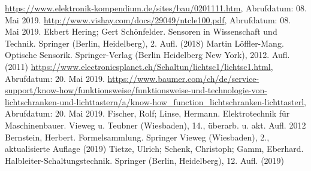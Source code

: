 \begin{thebibliography}{99}
 \url{https://www.elektronik-kompendium.de/sites/bau/0201111.htm}, Abrufdatum: 08. Mai 2019.
 \url{http://www.vishay.com/docs/29049/ntcle100.pdf}, Abrufdatum: 08. Mai 2019.
 Ekbert Hering; Gert Schönfelder. Sensoren in Wissenschaft und Technik. Springer (Berlin, Heidelberg), 2. Aufl. (2018)
 Martin Löffler-Mang. Optische Sensorik. Springer-Verlag (Berlin Heidelberg New York), 2012. Aufl. (2011)
 \url{https://www.electronicsplanet.ch/Schaltun/lichtsc1/lichtsc1.html}, Abrufdatum: 20. Mai 2019.
 \url{https://www.baumer.com/ch/de/service-support/know-how/funktionsweise/funktionsweise-und-technologie-von-lichtschranken-und-lichttastern/a/know-how_function_lichtschranken-lichttasterl}, Abrufdatum: 20. Mai 2019.
 Fischer, Rolf; Linse, Hermann. Elektrotechnik für Maschinenbauer. Vieweg u. Teubner (Wiesbaden), 14., überarb. u. akt. Aufl. 2012
 Bernstein, Herbert. Formelsammlung. Springer Vieweg (Wiesbaden), 2., aktualisierte Auflage (2019)
 Tietze, Ulrich; Schenk, Christoph; Gamm, Eberhard. Halbleiter-Schaltungstechnik. Springer (Berlin, Heidelberg), 12. Aufl. (2019)
\end{thebibliography}